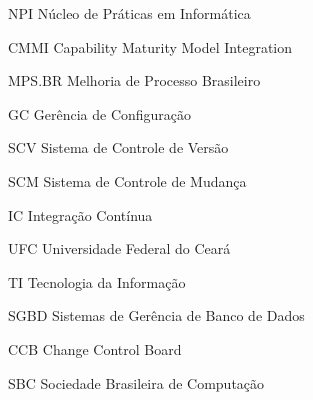 \begin{siglas}
  \item[NPI] Núcleo de Práticas em Informática
  \item[CMMI] Capability Maturity Model Integration
  \item[MPS.BR] Melhoria de Processo Brasileiro
  \item[GC] Gerência de Configuração
  \item[SCV] Sistema de Controle de Versão
  \item[SCM] Sistema de Controle de Mudança
  \item[IC]  Integração Contínua
  \item[UFC] Universidade Federal do Ceará
  \item[TI] Tecnologia da Informação
  \item[SGBD] Sistemas de Gerência de Banco de Dados
  \item[CCB] Change Control Board
  \item[SBC] Sociedade Brasileira de Computação
\end{siglas}
